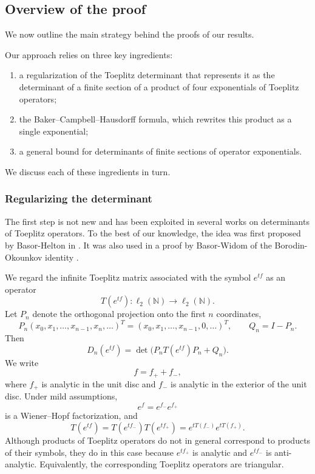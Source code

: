 \documentclass[11pt]{amsart}
\theoremstyle{plain}
\theoremstyle{remark}
\numberwithin{equation}{section}
\begin{document}
\subsection{Overview of the proof}

We now outline the main strategy behind the proofs of our results. 

Our approach relies on three key ingredients:
\begin{enumerate}
\item a regularization of the Toeplitz determinant that represents it as the determinant of a finite section of a product of four exponentials of Toeplitz operators;
\item the Baker--Campbell--Hausdorff formula, which rewrites this product as a single exponential;
\item a general bound for determinants of finite sections of operator exponentials.
\end{enumerate}
We discuss each of these ingredients in turn.

\subsubsection{Regularizing the determinant}
The first step is not new and has been exploited in several works on determinants of Toeplitz operators. To the best of our knowledge, the idea was first proposed by Basor-Helton in \cite{BasHelt}. It was also used in a proof by Basor-Widom of the Borodin-Okounkov identity \cite{BasorWidom}.

We regard the infinite Toeplitz matrix associated with the symbol $e^{tf}$ as
an operator
\[
T(e^{tf})\colon \ell_2(\mathbb{N})\to\ell_2(\mathbb{N}).
\]
Let $P_n$ denote the orthogonal projection onto the first $n$ coordinates,
\begin{equation}\label{eqn:pnqn}
P_n(x_0,x_1,\ldots,x_{n-1},x_n,\ldots)^T
=
(x_0,x_1,\ldots,x_{n-1},0,\ldots)^T,
\qquad
Q_n=I-P_n.
\end{equation}
Then
\[
D_n(e^{tf})
=
\det\bigl(P_nT(e^{tf})P_n+Q_n\bigr).
\]
%
We write
\[
f=f_++f_-,
\]
where $f_+$ is analytic in the unit disc and $f_-$ is analytic in the
exterior of the unit disc. Under mild assumptions,
\[
e^f=e^{f_-}e^{f_+}
\]
is a Wiener--Hopf factorization, and
\begin{equation}\label{eqn:WH}
T(e^{tf})
=
T(e^{tf_-})T(e^{tf_+})
=
e^{tT(f_-)}e^{tT(f_+)}.
\end{equation}
Although products of Toeplitz operators do not in general correspond to
products of their symbols, they do in this case because $e^{tf_+}$ is
analytic and $e^{tf_-}$ is anti-analytic. Equivalently, the corresponding
Toeplitz operators are triangular.
\end{document}
